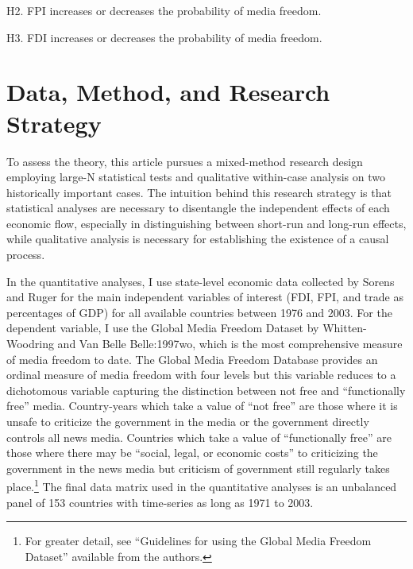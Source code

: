 \documentclass[12pt,a4paper]{article}\usepackage[]{graphicx}\usepackage[]{color}
\begin{document}
H2. FPI increases or decreases the probability of media freedom.

H3. FDI increases or decreases the probability of media freedom.


\section{Data, Method, and Research Strategy}

To assess the theory, this article pursues a mixed-method research design employing large-N statistical tests and qualitative within-case analysis on two historically important cases. The intuition behind this research strategy is that statistical analyses are necessary to disentangle the independent effects of each economic flow, especially in distinguishing between short-run and long-run effects, while qualitative analysis is necessary for establishing the existence of a causal process.

In the quantitative analyses, I use state-level economic data collected by Sorens and Ruger \parencite*{Sorens:2012hc} for the main independent variables of interest (FDI, FPI, and trade as percentages of GDP) for all available countries between 1976 and 2003. For the dependent variable, I use the Global Media Freedom Dataset by Whitten-Woodring and Van Belle \parencite{van2000press}{Belle:1997wo}, which is the most comprehensive measure of media freedom to date. The Global Media Freedom Database provides an ordinal measure of media freedom with four levels but this variable reduces to a dichotomous variable capturing the distinction between not free and ``functionally free'' media. Country-years which take a value of ``not free'' are those where it is unsafe to criticize the government in the media or the government directly controls all news media. Countries which take a value of ``functionally free'' are those where there may be ``social, legal, or economic costs'' to criticizing the government in the news media but criticism of government still regularly takes place.\footnote{For greater detail, see ``Guidelines for using the Global Media Freedom Dataset'' available from the authors.} The final data matrix used in the quantitative analyses is an unbalanced panel of 153 countries with time-series as long as 1971 to 2003.
\end{document}

